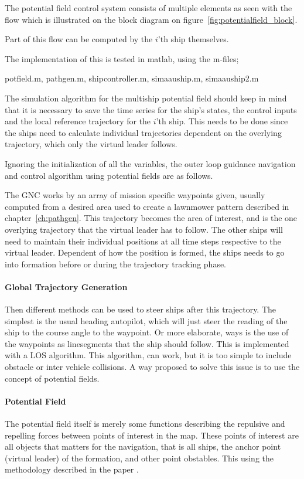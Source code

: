 The potential field control system consists of multiple elements
as seen with the flow which is illustrated on the block diagram on
figure~\vref{fig:potentialfield_block}.

Part of this flow can be computed by the $i$'th ship themselves.

The implementation of this is tested in matlab, using the m-files;

potfield.m, pathgen.m, shipcontroller.m, simaauship.m, simaauship2.m

The simulation algorithm for the multiship potential field should keep
in mind that it is necessary to save the time series for the ship's states, the control inputs and the local reference trajectory for the $i$'th ship. This needs to be done since the ships need to calculate individual trajectories dependent on the overlying trajectory, which only the virtual leader follows.

Ignoring the initialization of all the variables, the outer loop
guidance navigation and control algorithm using potential fields are
as follows.

The \ac{GNC} works by an array of mission specific waypoints given,
usually computed from a desired area used to create a lawnmower
pattern described in chapter~\vref{ch:pathgen}. This trajectory becomes the area of interest, and is the one overlying trajectory that the virtual leader has to follow. The other ships will need to maintain their individual positions at all time steps respective to the virtual leader. Dependent of how the position is formed, the ships needs to go into formation before or during the trajectory tracking phase. 

\paragraph{Global Trajectory Generation}
Then different methods can be used to steer ships after this
trajectory. The simplest is the usual heading autopilot, which will
just steer the reading of the ship to the course angle to the
waypoint. Or more elaborate, ways is the use of the waypoints as
linesegments that the ship should follow. This is implemented with a
\ac{LOS} algorithm. This algorithm, can work, but it is too simple to
include obstacle or inter vehicle collisions. A way proposed to solve
this issue is to use the concept of potential fields.

\paragraph{Potential Field}
The potential field itself is merely some functions describing the
repulsive and repelling forces between points of interest in the map.
These points of interest are all objects that matters for the
navigation, that is all ships, the anchor point (virtual leader) of
the formation, and other point obstables. This using the methodology
described in the paper \citep{UAVff3dpf}.

